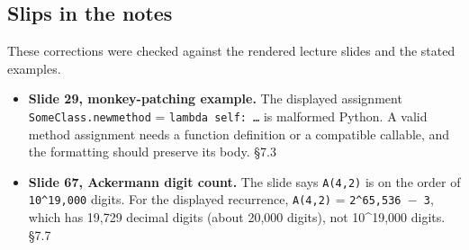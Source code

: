 \documentclass[11pt]{article}
\begin{document}
\begin{keepsection}
\section{Slips in the notes}

These corrections were checked against the rendered lecture slides and the stated examples.

\begin{itemize}
\item \textbf{Slide 29, monkey-patching example.} The displayed assignment \texttt{SomeClass.newmethod} = \texttt{lambda self: …} is malformed Python. A valid method assignment needs a function definition or a compatible callable, and the formatting should preserve its body. \hfill{\small\color{FAUblue}§7.3}
\item \textbf{Slide 67, Ackermann digit count.} The slide says \texttt{A(4,2)} is on the order of \texttt{10\textasciicircum{}19,000} digits. For the displayed recurrence, \texttt{A(4,2)} = \texttt{2\textasciicircum{}65,536 \ensuremath{-} 3}, which has 19,729 decimal digits (about 20,000 digits), not 10\textasciicircum{}19,000 digits. \hfill{\small\color{FAUblue}§7.7}
\end{itemize}
\end{keepsection}
\end{document}
